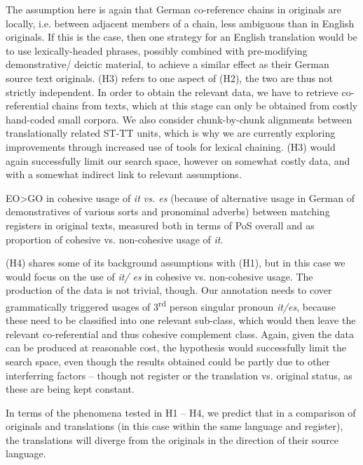 \documentclass[output=paper]{LSP/langsci}
\begin{document}
\begin{exe}
\begin{exe}
\begin{exe}
The assumption here is again that German co-reference chains in originals are locally, i.e. between adjacent members of a chain, less ambiguous than in English originals. If this is the case, then one strategy for an English translation would be to use lexically-headed phrases, possibly combined with pre-modifying demonstrative/ deictic material, to achieve a similar effect as their German source text originals. {(H3)}
refers to one aspect of %
{(H2)}, the two are thus not strictly independent. In order to obtain the relevant data, we have to retrieve co-referential chains from texts, which at this stage can only be obtained from costly hand-coded small corpora. We also consider chunk-by-chunk alignments between translationally related ST-TT units, which is why we are currently exploring improvements through increased use of tools for lexical chaining. %
{(H3)} would again successfully limit our search space, however on somewhat costly data, and with a somewhat indirect link to relevant assumptions.

\begin{exe}\label{hyp:steiner:4} 
EO{\textgreater}GO in cohesive usage of \textit{it vs. es} (because of alternative usage in German of demonstratives of various sorts and pronominal adverbs) between matching registers in original texts, measured both in terms of PoS overall and as proportion of cohesive vs. non-cohesive usage of \textit{it}.
\z

{(H4)} shares some of its background assumptions with {(H1)}, but in this case we would focus on the use of \textit{it/ es }in cohesive vs. non-cohesive usage. The production of the data is not trivial, though. Our annotation needs to cover grammatically triggered usages of 3\textsuperscript{rd} person singular pronoun \textit{it/es}, because these need to be classified into one relevant sub-class, which would then leave the relevant co-referential and thus cohesive complement class. Again, given the data can be produced at reasonable cost, the hypothesis would successfully limit the search space, even though the results obtained could be partly due to other interferring factors -- though not register or the translation vs. original status, as these are being kept constant. 

\begin{exe}\label{hyp:steiner:5} 
In terms of the phenomena tested in H1 -- H4, we predict that in a comparison of originals and translations (in this case within the same language and register), the translations will diverge from the originals in the direction of their source language. 
\z


\end{exe}
\end{exe}
\end{exe}
\end{exe}
\end{exe}
\end{document}
